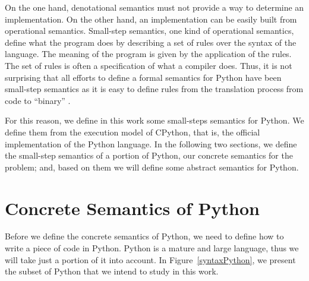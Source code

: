 On the one hand, denotational semantics must not provide a way to determine an implementation.
On the other hand, an implementation can be easily built from operational semantics.
Small-step semantics, one kind of operational semantics, define what the program does by
describing a set of rules over the syntax of the language. The meaning of the program is
given by the application of the rules. The set of rules is often a specification of what a
compiler does. Thus, it is not surprising that all efforts to define a formal semantics for
Python have been small-step semantics as it is easy to define rules from the translation
process from code to \enquote{binary}
\autocites{ranson_semantics_2008}{guth_formal_2013}{politz_python_2013}{fromherz_static_2018}.

For this reason, we define in this work some small-steps semantics for Python. We define
them from the execution model of CPython, that is, the official implementation of the
Python language. In the following two sections, we define the small-step semantics of a
portion of Python, our concrete semantics for the problem; and, based on them we will
define some abstract semantics for Python.

\section{Concrete Semantics of Python}

Before we define the concrete semantics of Python, we need to define how to write a piece
of code in Python. Python is a mature and large language, thus we will take just a portion
of it into account. In Figure~\ref{syntaxPython}, we present the subset of Python that we intend to
study in this work.

